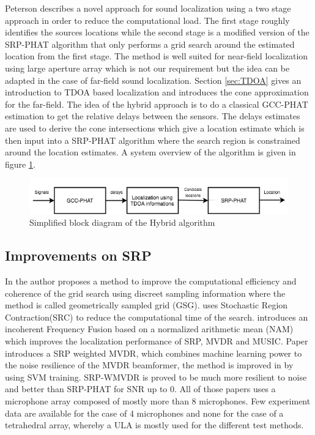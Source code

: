 Peterson \cite{peterson2005hybrid} describes a novel approach for sound localization using a two stage approach in order to reduce the computational load. The first stage roughly identifies the sources locations while the second stage is a modified version of the SRP-PHAT algorithm that only performs a grid search around the estimated location from the first stage.  The method is well suited for near-field localization using large aperture array which is not our requirement but the idea can be adapted in the case of far-field sound localization. Section \ref{sec:TDOA} gives an introduction to TDOA based localization and introduces the cone approximation for the far-field. The idea of the hybrid approach is to do a classical GCC-PHAT estimation to get the relative delays between the sensors. The delays estimates are used to derive the cone intersections which give a location estimate which is then input into a SRP-PHAT algorithm where the search region is constrained around the location estimates. A system overview of the algorithm is given in figure \ref{fig:hybridalgo}.

\begin{figure}[H]
    \centering
    \includegraphics[width=1\textwidth]{Figures/hybridalgo.png}
    \caption{Simplified block diagram of the Hybrid algorithm}
    \label{fig:hybridalgo}
\end{figure}

\subsection{Improvements on SRP}

In \cite{salvati2017exploiting} the author proposes a method to improve the computational efficiency and coherence of the grid search using discreet sampling information where the method is called geometrically sampled grid (GSG). \cite{do2007real} uses Stochastic Region Contraction(SRC) to reduce the computational time of the search. \cite{salvati2014incoherent} introduces an incoherent Frequency Fusion based on a normalized arithmetic mean (NAM) which improves the localization performance of SRP, MVDR and MUSIC. Paper \cite{salvati2015frequency} introduces a SRP weighted MVDR, which combines machine learning power to the noise resilience of the MVDR beamformer, the method is improved in \cite{salvati2016use} by using SVM training. SRP-WMVDR is proved to be much more resilient to noise and better than SRP-PHAT for SNR up to 0. All of those papers uses a microphone array composed of mostly more than 8 microphones. Few experiment data are available for the case of 4 microphones and none for the case of a tetrahedral array, whereby a ULA is mostly used for the different test methods.


